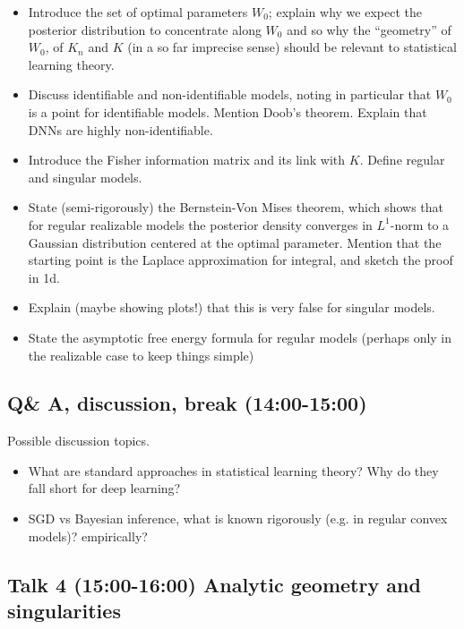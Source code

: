 \documentclass[a4paper,11pt]{amsart}
\begin{document}
\begin{itemize}
\item Introduce the set of optimal parameters $W_{0}$; explain why we expect the posterior distribution to concentrate along $W_{0}$ and so why the ``geometry'' of $W_{0}$, of $K_{n}$ and $K$ (in a so far imprecise sense) should be relevant to statistical learning theory.
\item Discuss identifiable and non-identifiable models, noting in particular that $W_{0}$ is a point for identifiable models. Mention Doob's theorem. Explain that DNNs are highly non-identifiable.
\item Introduce the Fisher information matrix and its link with $K$. Define regular and singular models.
\item State (semi-rigorously) the Bernstein-Von Mises theorem, which shows that for regular realizable models the posterior density converges in $L^{1}$-norm to a Gaussian distribution centered at the optimal parameter. Mention that the starting point is the Laplace approximation for integral, and sketch the proof in 1d.
\item Explain (maybe showing plots!) that this is very false for singular models.  
\item State the asymptotic free energy formula for regular models (perhaps only in the realizable case to keep things simple) \cite[\S 4.2 Theorem 4]{green-book}
\end{itemize}

\subsection*{Q\& A, discussion, break (14:00-15:00)}
Possible discussion topics.
\begin{itemize}
\item What are standard approaches in statistical learning theory? Why do they fall short for deep learning?
\item SGD vs Bayesian inference, what is known rigorously (e.g. in regular convex models)? empirically?
\end{itemize}


\subsection*{Talk 4 (15:00-16:00) Analytic geometry and singularities}
\end{document}
